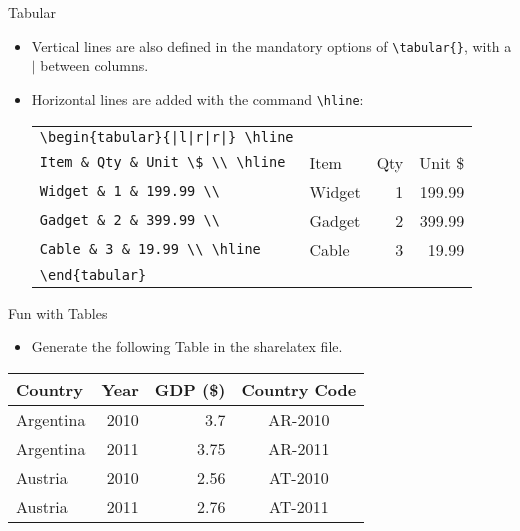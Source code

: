 \documentclass{beamer}
\begin{document}
\begin{frame}[fragile]{Tabular}
	\begin{itemize}
		\item Vertical lines are also defined in the mandatory options of \verb|\tabular{}|, with a $\mid$ between columns.
		\item Horizontal lines are  added with the command \verb|\hline|:
		
		\medskip
		\begin{tabular}{l | l|r|r|}
			\verb=\begin{tabular}{|l|r|r|} \hline=  &
			\multicolumn{3}{c}{ } \\ \cline{2-4}
			\verb=Item & Qty & Unit \$ \\ \hline= & Item & Qty & Unit \$ \\ \cline{2-4}
			\verb=Widget & 1 & 199.99 \\= & Widget & 1 & 199.99 \\
			\verb=Gadget & 2 & 399.99 \\= & Gadget & 2 & 399.99 \\ 
			\verb=Cable & 3 & 19.99 \\ \hline= & Cable & 3 & 19.99 \\ \cline{2-4}
			\verb|\end{tabular}|
		\end{tabular}
	\end{itemize}
\end{frame}

\begin{frame}{Fun with Tables}
	\begin{itemize}
		\item Generate the following Table in the sharelatex file.
	\end{itemize}
	\begin{tabular}{|l r r | c|} \hline
	\textbf{Country} & \textbf{Year} & \textbf{GDP (\$)} & \textbf{Country Code} \\ \hline
	Argentina & 2010 & 3.7 & AR-2010 \\
	Argentina & 2011 & 3.75 & AR-2011 \\
	Austria & 2010 & 2.56 & AT-2010 \\
	Austria & 2011 & 2.76 & AT-2011 \\ \hline
	\end{tabular}
\end{frame}
\end{document}

